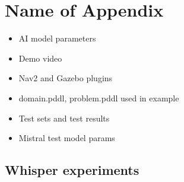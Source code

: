 \chapter{Name of Appendix}

\begin{itemize}
    \item AI model parameters
    \item Demo video
    \item Nav2 and Gazebo plugins
    \item domain.pddl, problem.pddl used in example
    \item Test sets and test results
    \item Mistral test model params
\end{itemize}

\section{Whisper experiments}
